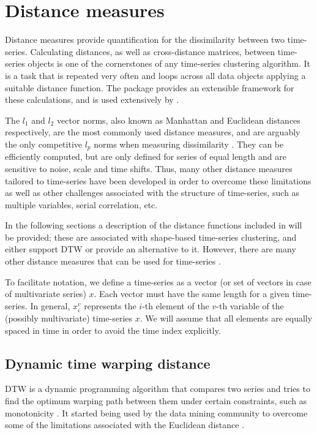 \section{Distance measures}
\label{sec:distances}

Distance measures provide quantification for the dissimilarity between two time-series.
Calculating distances,
as well as cross-distance matrices,
between time-series objects is one of the cornerstones of any time-series clustering algorithm.
It is a task that is repeated very often and loops across all data objects applying a suitable distance function.
The  package \citep{proxy} provides an extensible framework for these calculations,
and is used extensively by \dtwclust{}.

The $l_1$ and $l_2$ vector norms,
also known as Manhattan and Euclidean distances respectively,
are the most commonly used distance measures,
and are arguably the only competitive $l_p$ norms when measuring dissimilarity \citep{aggarwal2001, lemire2009}.
They can be efficiently computed,
but are only defined for series of equal length and are sensitive to noise,
scale and time shifts.
Thus, many other distance measures tailored to time-series have been developed in order to overcome these limitations as well as other challenges associated with the structure of time-series,
such as multiple variables,
serial correlation, etc.

In the following sections a description of the distance functions included in \dtwclust{} will be provided;
these are associated with shape-based time-series clustering,
and either support DTW or provide an alternative to it.
However, there are many other distance measures that can be used for time-series \citep{montero2014, tsdist}.

To facilitate notation,
we define a time-series as a vector (or set of vectors in case of multivariate series) $x$.
Each vector must have the same length for a given time-series.
In general, $x^v_i$ represents the $i$-th element of the $v$-th variable of the (possibly multivariate) time-series $x$.
We will assume that all elements are equally spaced in time in order to avoid the time index explicitly.

\subsection{Dynamic time warping distance}
\label{sec:dtw}

DTW is a dynamic programming algorithm that compares two series and tries to find the optimum warping path between them under certain constraints,
such as monotonicity \citep{berndt1994}.
It started being used by the data mining community to overcome some of the limitations associated with the Euclidean distance \citep{keogh2004}.


